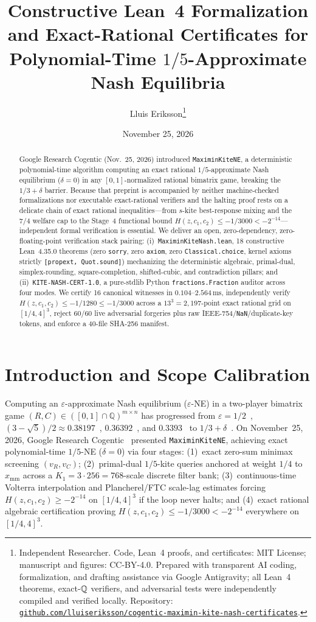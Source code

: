 \documentclass[10pt,twocolumn]{article}
\title{\vspace{-1.0em}\textbf{Constructive Lean~4 Formalization and Exact-Rational Certificates for Polynomial-Time $1/5$-Approximate Nash Equilibria}}
\author{Lluis Eriksson\thanks{Independent Researcher. Code, Lean~4 proofs, and certificates: MIT License; manuscript and figures: CC-BY-4.0. Prepared with transparent AI coding, formalization, and drafting assistance via Google Antigravity; all Lean~4 theorems, exact-$\QQ$ verifiers, and adversarial tests were independently compiled and verified locally. Repository: \href{https://github.com/lluiseriksson/cogentic-maximin-kite-nash-certificates}{\nolinkurl{github.com/lluiseriksson/cogentic-maximin-kite-nash-certificates}}.}}
\date{November 25, 2026}
\newcommand{\QQ}{\mathbb{Q}}
\begin{document}
\maketitle
\vspace{-1.3em}

\begin{abstract}
Google Research Cogentic (Nov.~25, 2026) introduced \texttt{MaximinKiteNE}, a deterministic polynomial-time algorithm computing an exact rational $1/5$-approximate Nash equilibrium ($\delta = 0$) in any $[0,1]$-normalized rational bimatrix game, breaking the $1/3+\delta$ barrier. Because that preprint is accompanied by neither machine-checked formalizations nor executable exact-rational verifiers and the halting proof rests on a delicate chain of exact rational inequalities—from $s$-kite best-response mixing and the $7/4$ welfare cap to the Stage~4 functional bound $H(z,c_1,c_2) \le -1/3000 < -2^{-14}$—independent formal verification is essential. We deliver an open, zero-dependency, zero-floating-point verification stack pairing: (i)~\texttt{MaximinKiteNash.lean}, 18 constructive Lean~4.35.0 theorems (zero \texttt{sorry}, zero \texttt{axiom}, zero \texttt{Classical.choice}, kernel axioms strictly \texttt{[propext, Quot.sound]}) mechanizing the deterministic algebraic, primal-dual, simplex-rounding, square-completion, shifted-cubic, and contradiction pillars; and (ii)~\texttt{KITE-NASH-CERT-1.0}, a pure-stdlib Python \texttt{fractions.Fraction} auditor across four modes. We certify 16 canonical witnesses in $0.104$--$2.564\,\mathrm{ms}$, independently verify $H(z,c_1,c_2) \le -1/1280 \le -1/3000$ across a $13^3 = 2{,}197$-point exact rational grid on $[1/4,4]^3$, reject 60/60 live adversarial forgeries plus raw IEEE-754/\texttt{NaN}/duplicate-key tokens, and enforce a 40-file SHA-256 manifest.
\end{abstract}

\section{Introduction and Scope Calibration}\label{sec:intro}
Computing an $\varepsilon$-approximate Nash equilibrium ($\varepsilon$-NE) in a two-player bimatrix game $(R,C) \in ([0,1]\cap\QQ)^{m\times n}$ has progressed from $\varepsilon=1/2$~\cite{daskalakis2006note}, $(3-\sqrt{5})/2 \approx 0.38197$~\cite{daskalakis2007progress}, $0.36392$~\cite{bosse2007new}, and $0.3393$~\cite{tsaknakis2008optimization} to $1/3+\delta$~\cite{deligkas2022gradient}. On November~25, 2026, Google Research Cogentic~\cite{cogentic2026maximin} presented \texttt{MaximinKiteNE}, achieving exact polynomial-time $1/5$-NE ($\delta=0$) via four stages: (1)~exact zero-sum minimax screening $(v_R,v_C)$; (2)~primal-dual $1/5$-kite queries anchored at weight $1/4$ to $x_{\mathrm{mm}}$ across a $K_1 = 3\cdot 256 = 768$-scale discrete filter bank; (3)~continuous-time Volterra interpolation and Plancherel/FTC scale-lag estimates forcing $H(z,c_1,c_2) \ge -2^{-14}$ on $[1/4,4]^3$ if the loop never halts; and (4)~exact rational algebraic certification proving $H(z,c_1,c_2) \le -1/3000 < -2^{-14}$ everywhere on $[1/4,4]^3$.
\end{document}
